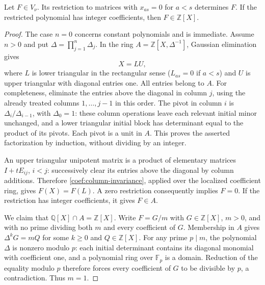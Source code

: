 \begin{lemma}\label{coef:restriction}
Let $F\in V_\nu$. Its restriction to matrices with $x_{as}=0$ for
$a<s$ determines $F$. If the restricted polynomial has integer
coefficients, then $F\in\mathbb Z[X]$.
\end{lemma}
\begin{proof}
The case $n=0$ concerns constant polynomials and is immediate. Assume
$n>0$ and put $\Delta=\prod_{j=1}^n\Delta_j$.
In the ring $A=\mathbb Z[X,\Delta^{-1}]$, Gaussian elimination gives
\[
                         X=LU,
\]
where $L$ is lower triangular in the rectangular sense
($L_{as}=0$ if $a<s$) and $U$ is upper triangular with diagonal entries
one. All entries belong to $A$.
For completeness, eliminate the entries above the diagonal in column
$j$, using the already treated columns $1,\ldots,j-1$ in this order.
The pivot in column $i$ is $\Delta_i/\Delta_{i-1}$, with
$\Delta_0=1$: these column operations leave each relevant initial
minor unchanged, and a lower triangular initial block has determinant
equal to the product of its pivots. Each pivot is a unit in $A$.
This proves the asserted factorization by induction, without dividing
by an integer.

An upper triangular unipotent matrix is a product of elementary
matrices $I+tE_{ij}$, $i<j$: successively clear its entries above the
diagonal by column additions. Therefore
\eqref{coef:column-invariance}, applied over the localized coefficient
ring, gives $F(X)=F(L)$. A zero restriction consequently implies $F=0$.
If the restriction has integer coefficients, it gives
$F\in A$.

We claim that $\mathbb Q[X]\cap A=\mathbb Z[X]$.
Write $F=G/m$ with $G\in\mathbb Z[X]$, $m>0$, and with no prime
dividing both $m$ and every coefficient of $G$. Membership in $A$
gives $\Delta^kG=mQ$ for some $k\ge0$ and $Q\in\mathbb Z[X]$.
For any prime $p\mid m$, the polynomial $\Delta$ is nonzero modulo
$p$: each initial determinant contains its diagonal monomial with
coefficient one, and a polynomial ring over $\mathbb F_p$ is a domain.
Reduction of the equality modulo $p$ therefore forces every coefficient
of $G$ to be divisible by $p$, a contradiction. Thus $m=1$.
\end{proof}

